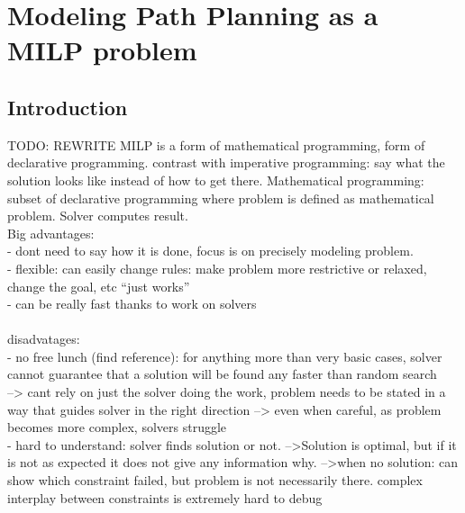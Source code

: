\section{Modeling Path Planning as a MILP problem}
\label{section:modelingbasic}
\subsection{Introduction}
TODO: REWRITE
MILP is a form of mathematical programming, form of declarative programming. contrast with imperative programming: say what the solution looks like instead of how to get there. Mathematical programming: subset of declarative programming where problem is defined as mathematical problem. Solver computes result.\\
Big advantages: \\
- dont need to say how it is done, focus is on precisely modeling problem.\\
- flexible: can easily change rules: make problem more restrictive or relaxed, change the goal, etc ``just works''\\
- can be really fast thanks to work on solvers\\
\\
disadvatages:\\
- no free lunch (find reference): for anything more than very basic cases, solver cannot guarantee that a solution will be found any faster than random search\\
	--> cant rely on just the solver doing the work, problem needs to be stated in a way that guides solver in the right direction
	--> even when careful, as problem becomes more complex, solvers struggle\\
-  hard to understand: solver finds solution or not.
	-->Solution is optimal, but if it is not as expected it does not give any information why.
	-->when no solution: can show which constraint failed, but problem is not necessarily there. complex interplay between constraints is extremely hard to debug\\





